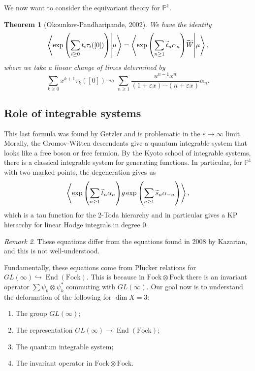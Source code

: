 \documentclass[leqno, openany]{memoir}
\newtheorem{thm}{Theorem}[section]
\theoremstyle{definition}
\theoremstyle{remark}
\newtheorem{rmk}[thm]{Remark}
\theoremstyle{plain}
\theoremstyle{definition}
\theoremstyle{remark}
\renewcommand{\P}{\mathbb{P}}
\newcommand{\ep}{\varepsilon}
\newcommand{\mr}[1]{\mathrm{#1}}
\newcommand{\wt}[1]{\widetilde{#1}}
\DeclareMathOperator{\End}{End}
\begin{document}
We now want to consider the equivariant theory for $\P^1$.
\begin{thm}[Okounkov-Pandharipande, 2002]
    We have the identity
    \[ \braket{\exp\qty(\sum_{i \geq 0} t_i \tau_i([0]))}{\mu} = \braket{\exp\qty(\sum_{n \geq 1} \wt{t}_n \alpha_n) \wt{W}}{\mu}, \]
    where we take a linear change of times determined by
    \[ \sum_{k \geq 0} x^{k+1} \tau_k([0]) \rightsquigarrow \sum_{n \geq 1} \frac{u^{n-1}x^n}{(1+\ep x) \cdots (n+\ep x)} \alpha_n. \]
\end{thm}

\subsection{Role of integrable systems}

This last formula was found by Getzler and is problematic in the $\ep \to \infty$ limit. Morally, the Gromov-Witten descendents give a quantum integrable system that looks like a free boson or free fermion. By the Kyoto school of integrable systems, there is a classical integrable system for generating functions. In particular, for $\P^1$ with two marked points, the degeneration gives us
\[ \ev{\exp \qty(\sum_{n \geq 1} \wt{t}_n \alpha_n) g \exp\qty(\sum_{n \geq 1} \wt{s}_n \alpha_{-n})}, \]
which is a tau function for the 2-Toda hierarchy and in particular gives a KP hierarchy for linear Hodge integrals in degree $0$.

\begin{rmk}
    These equations differ from the equations found in 2008 by Kazarian, and this is not well-understood.
\end{rmk}

Fundamentally, these equations come from Pl\"ucker relations for $GL(\infty) \hookrightarrow \End(\mr{Fock})$. This is because in $\mr{Fock} \otimes \mr{Fock}$ there is an invariant operator $\sum \psi_k \otimes \psi_k^*$ commuting with $GL(\infty)$. Our goal now is to understand the deformation of the following for $\dim X = 3$:
\begin{enumerate}
    \item The group $GL(\infty)$;
    \item The representation $GL(\infty) \to \End(\mr{Fock})$;
    \item The quantum integrable system;
    \item The invariant operator in $\mr{Fock} \otimes \mr{Fock}$.
\end{enumerate}
\end{document}
